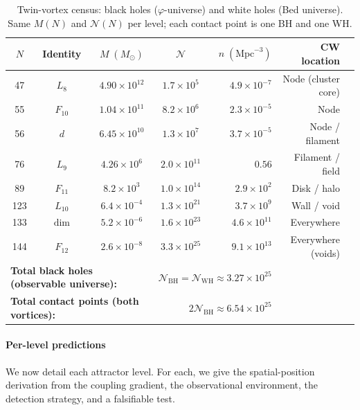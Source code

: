 \documentclass[12pt,a4paper]{article}
\newcommand{\bed}{Bed universe}
\begin{document}
\begin{table}[h!]
\centering\small
\caption{Twin-vortex census: black holes ($\varphi$-universe) and white holes (\bed{}). Same $M(N)$ and $\mathcal{N}(N)$ per level; each contact point is one BH and one WH.}
\label{tab:bh-wh-twin}
\begin{tabular}{cc cc rr l}
\toprule
$N$ & Identity & $M\;(M_\odot)$ & $\mathcal{N}$ & $n\;(\mathrm{Mpc}^{-3})$ & CW location \\
\midrule
47 & $L_8$ & $4.90\times 10^{12}$ & $1.7\times 10^{5}$ & $4.9\times 10^{-7}$ & Node (cluster core) \\
55 & $F_{10}$ & $1.04\times 10^{11}$ & $8.2\times 10^{6}$ & $2.3\times 10^{-5}$ & Node \\
56 & $d$ & $6.45\times 10^{10}$ & $1.3\times 10^{7}$ & $3.7\times 10^{-5}$ & Node / filament \\
76 & $L_9$ & $4.26\times 10^{6}$ & $2.0\times 10^{11}$ & $0.56$ & Filament / field \\
89 & $F_{11}$ & $8.2\times 10^{3}$ & $1.0\times 10^{14}$ & $2.9\times 10^{2}$ & Disk / halo \\
123 & $L_{10}$ & $6.4\times 10^{-4}$ & $1.3\times 10^{21}$ & $3.7\times 10^{9}$ & Wall / void \\
133 & $\dim$ & $5.2\times 10^{-6}$ & $1.6\times 10^{23}$ & $4.6\times 10^{11}$ & Everywhere \\
144 & $F_{12}$ & $2.6\times 10^{-8}$ & $3.3\times 10^{25}$ & $9.1\times 10^{13}$ & Everywhere (voids) \\
\midrule
\multicolumn{3}{l}{\textbf{Total black holes (observable universe):}} & \multicolumn{2}{r}{$\mathcal{N}_{\mathrm{BH}} = \mathcal{N}_{\mathrm{WH}} \approx 3.27 \times 10^{25}$} & \\
\multicolumn{3}{l}{\textbf{Total contact points (both vortices):}} & \multicolumn{2}{r}{$2\mathcal{N}_{\mathrm{BH}} \approx 6.54 \times 10^{25}$} & \\
\bottomrule
\end{tabular}
\end{table}

\paragraph{Per-level predictions}

We now detail each attractor level.  For each, we give the spatial-position derivation from the coupling gradient, the observational environment, the detection strategy, and a falsifiable test.
\end{document}

